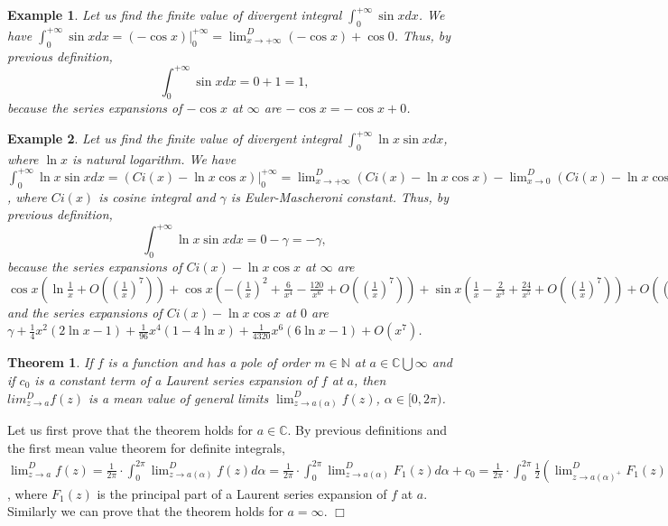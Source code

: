 \documentclass[12pt]{article}
\def\N{{\mathbb N}}
\def\Co{{\mathbb C}}
\newtheorem{thm}{Theorem}[section]
\newtheorem{ex}{Example}[section]
\newenvironment{proof}{\noindent {\sc Proof:}}{$\Box$ \medskip}
\begin{document}
\begin{ex}
Let us find the finite value of divergent integral $\int_0^{+\infty} \sin x dx$. We have $\int_0^{+\infty} \sin x dx=(-\cos x)|_0^{+\infty}=\lim^D_{x\to+\infty}(-\cos x)+\cos 0$. Thus, by previous definition, $$\int_0^{+\infty} \sin x dx=0+1=1,$$ because the series expansions of $-\cos x$ at $\infty$ are $-\cos x=-\cos x+0$.
\end{ex}

\begin{ex}
Let us find the finite value of divergent integral $\int_0^{+\infty} \ln x \sin x dx$, where $\ln x$ is natural logarithm. We have $\int_0^{+\infty} \ln x \sin x dx=(Ci(x)-\ln x \cos x) |_0^{+\infty}=\lim_{x\to+\infty}^D(Ci(x)-\ln x \cos x)-\lim_{x\to 0}^D(Ci(x)-\ln x \cos x)=0-\gamma=-\gamma$, where $Ci(x)$ is cosine integral and $\gamma$ is Euler-Mascheroni constant. Thus, by previous definition, $$\int_0^{+\infty} \ln x \sin x dx=0-\gamma=-\gamma,$$ because the series expansions of $Ci(x)-\ln x\cos x$ at $\infty$ are $\cos x(\ln\frac{1}{x}+O((\frac{1}{x})^7))+\cos x(-(\frac{1}{x})^2+\frac{6}{x^4}-\frac{120}{x^6}+O((\frac{1}{x})^7))+\sin x(\frac{1}{x}-\frac{2}{x^3}+\frac{24}{x^5}+O((\frac{1}{x})^7))+O((\frac{1}{x})^9)-i\pi\lfloor\frac{1}{2}-\frac{arg(x)}{\pi}\rfloor+0$ and the series expansions of $Ci(x)-\ln x\cos x$ at $0$ are $\gamma+\frac{1}{4}x^2(2\ln x-1)+\frac{1}{96}x^4(1-4\ln x)+\frac{1}{4320}x^6(6\ln x-1)+O(x^7)$.
\end{ex}

\begin{thm}
If $f$ is a function and has a pole of order $m\in \N$ at $a \in \Co\bigcup\infty$ and if $c_0$ is a constant term of a Laurent series expansion of $f$ at $a$, then $lim_{z\to a}^D f(z)$ is a mean value of general limits $\lim^D_{z\to a(\alpha)}f(z)$, $\alpha\in[0,2\pi)$.
\end{thm}

\begin{proof}
Let us first prove that the theorem holds for $a \in \Co$.
By previous definitions and the first mean value theorem for definite integrals,
$\lim^D_{z\to a}f(z)=\frac{1}{2\pi}\cdot\int_0^{2\pi}\lim^D_{z\to a(\alpha)}f(z)d\alpha=
\frac{1}{2\pi}\cdot\int_0^{2\pi} \lim^D_{z\to a(\alpha)}F_1(z)d\alpha+c_0= 
\frac{1}{2\pi}\cdot\int_0^{2\pi} \frac{1}{2}(\lim^D_{z\to a(\alpha)^+}F_1(z)+\lim^D_{z\to a(\alpha)^-}F_1(z))d\alpha+c_0=
\frac{1}{2\pi}\cdot\int_0^{2\pi} \frac{1}{2}(\lim^D_{r\to 0^+}F_1(a+re^{i\alpha})+\lim^D_{z\to a(\alpha)^-}F_1(a+re^{i\alpha}))d\alpha+c_0=
\frac{1}{2\pi}\cdot\int_0^{2\pi} \frac{1}{2}(\lim^D_{r\to 0^+}\sum_{k=-m}^{-1}c_k(a+re^{i\alpha}-a)^k+\lim^D_{r\to 0^+}\sum_{k=-m}^{-1}c_k(a+re^{i\alpha}-a)^k)d\alpha+c_0=
\frac{1}{2\pi}\cdot\int_0^{2\pi} \frac{1}{2}(\int_{-\infty}^{-1}\sum_{k=-m}^{-1}c_k(re^{i\alpha})^kdr+\int_1^{+\infty}\sum_{k=-m}^{-1}c_k(re^{i\alpha})^kdr)d\alpha+c_0=
\frac{1}{2\pi}\cdot\int_0^{2\pi}\frac{1}{2}\sum_{k=-n}^{-1} c_k \frac{1+(-1)^k}{-k+1} e^{i\alpha k}d\alpha+c_0=
\frac{1}{2\pi}\cdot\frac{1}{2}\sum_{k=-n}^{-1} c_k \frac{1+(-1)^k}{-k+1} \int_0^{2\pi}e^{i\alpha k}d\alpha+c_0=
0+c_0=c_0$, where $F_1(z)$ is the principal part of a Laurent series expansion of $f$ at $a$.
Similarly we can prove that the theorem holds for $a=\infty$.
\end{proof}
\end{document}
